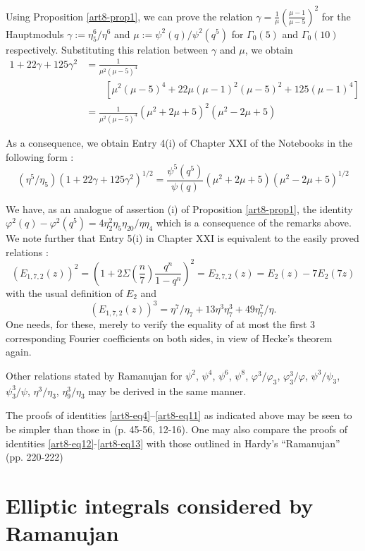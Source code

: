\begin{remark*}
Using Proposition \ref{art8-prop1}, we can prove the relation $\gamma=\frac{1}{\mu}\left(\frac{\mu-1}{\mu-5}\right)^{2}$ for the Hauptmoduls $\gamma:=\eta^{6}_{5}/\eta^{6}$ and $\mu:=\psi^{2}(q)/\psi^{2}(q^{5})$ for $\Gamma_{0}(5)$ and $\Gamma_{0}(10)$ respectively. Substituting this relation between $\gamma$ and $\mu$, we obtain
\begin{align*}
1+22\gamma+125\gamma^{2} &=\frac{1}{\mu^{2}(\mu-5)^{4}}\\
&\qquad[\mu^{2}(\mu-5)^{4}+22\mu(\mu-1)^{2}(\mu-5)^{2}+125(\mu-1)^{4}]\\
&= \frac{1}{\mu^{2}(\mu-5)^{4}}(\mu^{2}+2\mu+5)^{2}(\mu^{2}-2\mu+5)
\end{align*}\pageoriginale 
\end{remark*}

As a consequence, we obtain Entry 4(i) of Chapter XXI of the Notebooks in the following form :
$$
(\eta^{5}/\eta_{5})(1+22\gamma+125\gamma^{2})^{1/2}=\frac{\psi^{5}(q^{5})}{\psi(q)}(\mu^{2}+2\mu+5)(\mu^{2}-2\mu+5)^{1/2}
$$

We have, as an analogue of assertion (i) of Proposition \ref{art8-prop1}, the identity $\varphi^{2}(q)-\varphi^{2}(q^{5})=4\eta^{2}_{2}\eta_{5}\eta_{20}/\eta\eta_{4}$ which is a consequence of the remarks above. We note further that Entry 5(i) in Chapter XXI is equivalent to the easily proved relations :
$$
(E_{1,7,2}(z))^{2}=\left(1+2\Sigma\left(\dfrac{n}{7}\right)\frac{q^{n}}{1-q^{n}}\right)^{2}=E_{2,7,2}(z)=E_{2}(z)-7E_{2}(7z)
$$
with the usual definition of $E_{2}$ and
$$
(E_{1,7,2}(z))^{3}=\eta^{7}/\eta_{7}+13\eta^{3}\eta^{3}_{7}+49\eta^{7}_{7}/\eta.
$$
One needs, for these, merely to verify the equality of at most the first 3 corresponding Fourier coefficients on both sides, in view of Hecke's theorem again.

Other relations stated by Ramanujan for $\psi^{2}$, $\psi^{4}$, $\psi^{6}$, $\psi^{8}$, $\varphi^{3}/\varphi_{3}$, $\varphi^{3}_{3}/\varphi$, $\psi^{3}/\psi_{3}$, $\psi^{3}_{3}/\psi$, $\eta^{3}/\eta_{3}$, $\eta^{3}_{9}/\eta_{3}$ may be derived in the same manner.

The proofs of identities \eqref{art8-eq4}--\eqref{art8-eq11} as indicated above may be seen to be simpler than those in \cite{art8-key1} (p. 45-56, 12-16). One may also compare the proofs of identities \eqref{art8-eq12}-\eqref{art8-eq13} with those outlined in Hardy's ``Ramanujan'' (pp. 220-222)

\section{Elliptic integrals considered by Ramanujan}\label{art8-sec2}
~

